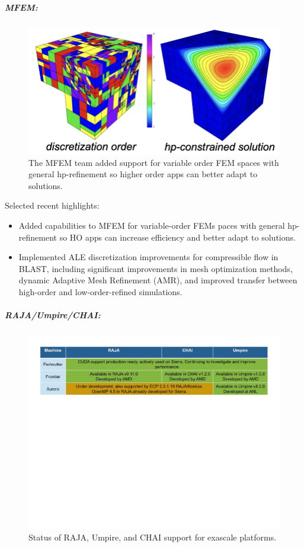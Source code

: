 \subparagraph{MFEM:}

\begin{figure}[tb]
\centering
\includegraphics[width=.4\textwidth]{projects/2.3.6-NNSA/2.3.6.02-LLNL-ATDM/mfem-hp-refinement}
\caption{The MFEM team added support for variable order FEM spaces with general hp-refinement so higher order apps can better adapt to solutions.}
\end{figure}

Selected recent highlights:
\begin{itemize}
\item Added capabilities to MFEM for variable-order FEMs paces with general hp-refinement so HO apps can increase efficiency and better adapt to solutions.
\item Implemented ALE discretization improvements for compressible flow in BLAST, including significant improvements in mesh optimization methods, dynamic Adaptive Mesh Refinement (AMR), and improved transfer between high-order and low-order-refined simulations.

\end{itemize}

\subparagraph{RAJA/Umpire/CHAI:}
\begin{figure}[htb]
\centering
\includegraphics[width=\textwidth]{projects/2.3.6-NNSA/2.3.6.02-LLNL-ATDM/raja-umpire-chai-support}
\caption{
Status of RAJA, Umpire, and CHAI support for exascale platforms.
}
\end{figure}

